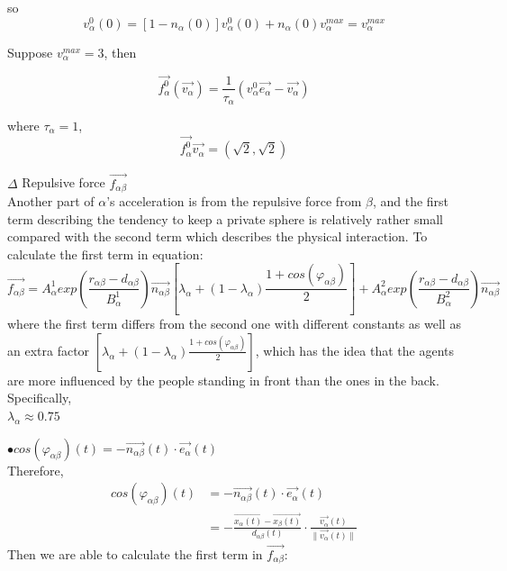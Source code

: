 so 
 \begin{equation}
 v^{0}_{\alpha}(0)=[1-n_{\alpha}(0)]v^{0}_{\alpha}(0) + n_{\alpha}(0)v_{\alpha}^{max} = v_{\alpha}^{max}
 \end{equation}
 
Suppose $v_{\alpha}^{max}=3$, then 

 \begin{equation}
 	\vec{f^{0}_{\alpha}} \left( \vec{v_{\alpha}} \right) 
= 	\frac{1}{\tau_{\alpha}} \left( v^{0}_{\alpha} 
	\vec{e_{\alpha}} - \vec{v_{\alpha}} \right)
 \end{equation}
 
where $\tau_{\alpha}=1$,
 \begin{equation}
 \overrightarrow{f^{0}_{\alpha}}\overrightarrow{v_{\alpha}} = (\sqrt{2}, \sqrt{2})
 \end{equation}

$\Delta$ Repulsive force $ \overrightarrow{f_{\alpha\beta}} $\\

Another part of $\alpha$'s acceleration is from the repulsive force from $\beta$, and the first term describing the tendency to keep a private sphere is relatively rather small compared with the second term which describes the physical interaction.
To calculate the first term in equation:
 \begin{equation}
\overrightarrow{f_{\alpha\beta}}=A^{1}_{\alpha} exp(\frac{r_{\alpha\beta}-d_{\alpha\beta}}{B^{1}_{\alpha}})\overrightarrow{n_{\alpha \beta}}\left[ \lambda_{\alpha} +(1-\lambda_{\alpha})\frac{1+cos(\varphi_{\alpha\beta})}{2}\right]+ A^{2}_{\alpha}exp(\frac{r_{\alpha\beta}-d_{\alpha\beta}}{B^{2}_{\alpha}})\overrightarrow{n_{\alpha\beta}}
 \end{equation}
where the first term differs from the second one with different constants as well as an extra factor $ \left[ \lambda_{\alpha} +(1-\lambda_{\alpha})\frac{1+cos(\varphi_{\alpha\beta})}{2}\right] $, which has the idea that the agents are more influenced by the people standing in front than the ones in the back. Specifically, \\

$\lambda_{\alpha} \approx 0.75$

$\bullet cos(\varphi_{\alpha\beta})(t)= -\overrightarrow{n_{\alpha \beta}}(t)\cdot\overrightarrow{e_{\alpha}}(t)$\\

Therefore,
\begin{equation}
\begin{split}
cos(\varphi_{\alpha\beta})(t)&= -\overrightarrow{n_{\alpha \beta}}(t)\cdot\overrightarrow{e_{\alpha}}(t)\\
&=-\frac{\overrightarrow{x_{\alpha}(t)}-\overrightarrow{x_{\beta}(t)}}{d_{\alpha \beta}(t)}\cdot\frac{\overrightarrow{v_{\alpha}}(t)}{\parallel \overrightarrow{v_{\alpha}}(t)\parallel}
\end{split}
\end{equation}
Then we are able to calculate the first term in $ \overrightarrow{f_{\alpha\beta}} $:

